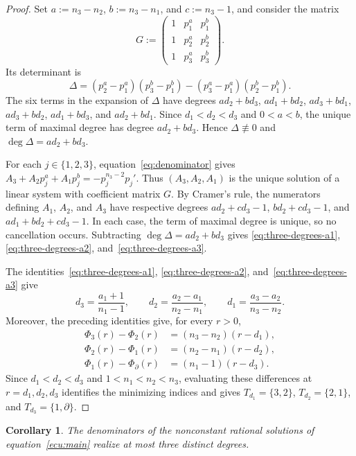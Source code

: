 \documentclass[12pt,a4paper]{amsart}
\numberwithin{theorem}{section}
\newtheorem{corollary}[theorem]{Corollary}
\theoremstyle{definition}
\begin{document}
	\begin{proof}
		Set $a:=n_3-n_2$, $b:=n_3-n_1$, and $c:=n_3-1$, and consider the matrix
		\[
		G:=
		\begin{pmatrix}
			1 & p_1^a & p_1^b\\
			1 & p_2^a & p_2^b\\
			1 & p_3^a & p_3^b
		\end{pmatrix}.
		\]
		Its determinant is
		\[
		\Delta=(p_2^a-p_1^a)(p_3^b-p_1^b)-(p_3^a-p_1^a)(p_2^b-p_1^b).
		\]
		The six terms in the expansion of $\Delta$ have degrees $ad_2+bd_3$, $ad_1+bd_2$, $ad_3+bd_1$, $ad_3+bd_2$, $ad_1+bd_3$, and $ad_2+bd_1$. Since $d_1<d_2<d_3$ and $0<a<b$, the unique term of maximal degree has degree $ad_2+bd_3$. Hence $\Delta\not\equiv0$ and $\deg\Delta=ad_2+bd_3$.
		
		For each $j\in\{1,2,3\}$, equation~\eqref{eq:denominator} gives $A_3+A_2p_j^a+A_1p_j^b=-p_j^{n_3-2}p_j'$. Thus $(A_3,A_2,A_1)$ is the unique solution of a linear system with coefficient matrix $G$. By Cramer's rule, the numerators defining $A_1$, $A_2$, and $A_3$ have respective degrees $ad_2+cd_3-1$, $bd_2+cd_3-1$, and $ad_1+bd_2+cd_3-1$. In each case, the term of maximal degree is unique, so no cancellation occurs. Subtracting $\deg\Delta=ad_2+bd_3$ gives \eqref{eq:three-degrees-a1}, \eqref{eq:three-degrees-a2}, and~\eqref{eq:three-degrees-a3}.
		
		The identities~\eqref{eq:three-degrees-a1}, \eqref{eq:three-degrees-a2}, and~\eqref{eq:three-degrees-a3} give
		\[
		d_3=\frac{a_1+1}{n_1-1},\qquad d_2=\frac{a_2-a_1}{n_2-n_1},\qquad d_1=\frac{a_3-a_2}{n_3-n_2}.
		\]
		Moreover, the preceding identities give, for every $r>0$,
		\[
		\begin{aligned}
			\Phi_3(r)-\Phi_2(r)&=(n_3-n_2)(r-d_1),\\
			\Phi_2(r)-\Phi_1(r)&=(n_2-n_1)(r-d_2),\\
			\Phi_1(r)-\Phi_\partial(r)&=(n_1-1)(r-d_3).
		\end{aligned}
		\]
		Since $d_1<d_2<d_3$ and $1<n_1<n_2<n_3$, evaluating these
		differences at $r=d_1,d_2,d_3$ identifies the minimizing indices
		and gives $T_{d_1}=\{3,2\}$, $T_{d_2}=\{2,1\}$, and
		$T_{d_3}=\{1,\partial\}$.
	\end{proof}
	
	\begin{corollary}\label{cor:at-most-three-degrees}
		The denominators of the nonconstant rational solutions of equation~\eqref{ecu:main} realize at most three distinct degrees.
	\end{corollary}
	
\end{document}
